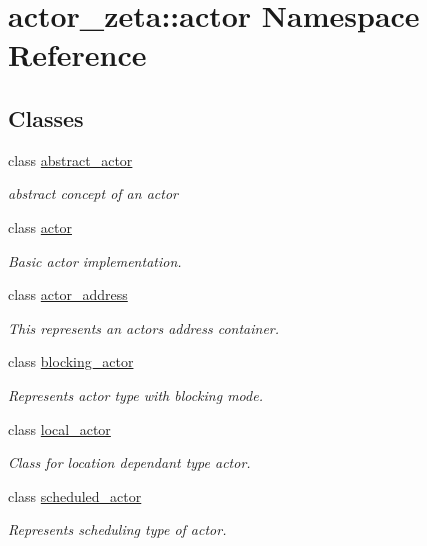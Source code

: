 \hypertarget{namespaceactor__zeta_1_1actor}{}\section{actor\+\_\+zeta\+:\+:actor Namespace Reference}
\label{namespaceactor__zeta_1_1actor}
\subsection*{Classes}
\begin{DoxyCompactItemize}
\item 
class \hyperlink{classactor__zeta_1_1actor_1_1abstract__actor}{abstract\+\_\+actor}
\begin{DoxyCompactList}\small\item\em abstract concept of an actor \end{DoxyCompactList}\item 
class \hyperlink{classactor__zeta_1_1actor_1_1actor}{actor}
\begin{DoxyCompactList}\small\item\em Basic actor implementation. \end{DoxyCompactList}\item 
class \hyperlink{classactor__zeta_1_1actor_1_1actor__address}{actor\+\_\+address}
\begin{DoxyCompactList}\small\item\em This represents an actor\textquotesingle{}s address container. \end{DoxyCompactList}\item 
class \hyperlink{classactor__zeta_1_1actor_1_1blocking__actor}{blocking\+\_\+actor}
\begin{DoxyCompactList}\small\item\em Represents actor type with blocking mode. \end{DoxyCompactList}\item 
class \hyperlink{classactor__zeta_1_1actor_1_1local__actor}{local\+\_\+actor}
\begin{DoxyCompactList}\small\item\em Class for location dependant type actor. \end{DoxyCompactList}\item 
class \hyperlink{classactor__zeta_1_1actor_1_1scheduled__actor}{scheduled\+\_\+actor}
\begin{DoxyCompactList}\small\item\em Represents scheduling type of actor. \end{DoxyCompactList}\end{DoxyCompactItemize}
